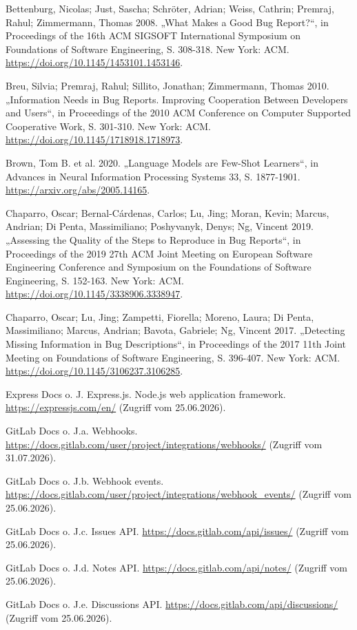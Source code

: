 \documentclass[12pt,a4paper,oneside]{scrreprt}
\begin{document}
Bettenburg, Nicolas; Just, Sascha; Schröter, Adrian; Weiss, Cathrin; Premraj, Rahul; Zimmermann, Thomas 2008. „What Makes a Good Bug Report?“, in Proceedings of the 16th ACM SIGSOFT International Symposium on Foundations of Software Engineering, S. 308-318. New York: ACM. \url{https://doi.org/10.1145/1453101.1453146}.

Breu, Silvia; Premraj, Rahul; Sillito, Jonathan; Zimmermann, Thomas 2010. „Information Needs in Bug Reports. Improving Cooperation Between Developers and Users“, in Proceedings of the 2010 ACM Conference on Computer Supported Cooperative Work, S. 301-310. New York: ACM. \url{https://doi.org/10.1145/1718918.1718973}.

Brown, Tom B. et al. 2020. „Language Models are Few-Shot Learners“, in Advances in Neural Information Processing Systems 33, S. 1877-1901. \url{https://arxiv.org/abs/2005.14165}.

Chaparro, Oscar; Bernal-Cárdenas, Carlos; Lu, Jing; Moran, Kevin; Marcus, Andrian; Di Penta, Massimiliano; Poshyvanyk, Denys; Ng, Vincent 2019. „Assessing the Quality of the Steps to Reproduce in Bug Reports“, in Proceedings of the 2019 27th ACM Joint Meeting on European Software Engineering Conference and Symposium on the Foundations of Software Engineering, S. 152-163. New York: ACM. \url{https://doi.org/10.1145/3338906.3338947}.

Chaparro, Oscar; Lu, Jing; Zampetti, Fiorella; Moreno, Laura; Di Penta, Massimiliano; Marcus, Andrian; Bavota, Gabriele; Ng, Vincent 2017. „Detecting Missing Information in Bug Descriptions“, in Proceedings of the 2017 11th Joint Meeting on Foundations of Software Engineering, S. 396-407. New York: ACM. \url{https://doi.org/10.1145/3106237.3106285}.

Express Docs o. J. Express.js. Node.js web application framework. \url{https://expressjs.com/en/} (Zugriff vom 25.06.2026).

GitLab Docs o. J.a. Webhooks. \url{https://docs.gitlab.com/user/project/integrations/webhooks/} (Zugriff vom 31.07.2026).

GitLab Docs o. J.b. Webhook events. \url{https://docs.gitlab.com/user/project/integrations/webhook_events/} (Zugriff vom 25.06.2026).

GitLab Docs o. J.c. Issues API. \url{https://docs.gitlab.com/api/issues/} (Zugriff vom 25.06.2026).

GitLab Docs o. J.d. Notes API. \url{https://docs.gitlab.com/api/notes/} (Zugriff vom 25.06.2026).

GitLab Docs o. J.e. Discussions API. \url{https://docs.gitlab.com/api/discussions/} (Zugriff vom 25.06.2026).
\end{document}

